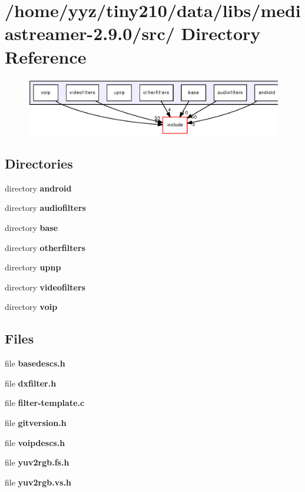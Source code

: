 \section{/home/yyz/tiny210/data/libs/mediastreamer-\/2.9.0/src/ Directory Reference}
\label{dir_d0be9f63c0f346f10187715b2de814fe}


\nopagebreak
\begin{figure}[H]
\begin{center}
\leavevmode
\includegraphics[width=345pt]{dir_d0be9f63c0f346f10187715b2de814fe_dep}
\end{center}
\end{figure}
\subsection*{Directories}
\begin{DoxyCompactItemize}
\item 
directory {\bf android}
\item 
directory {\bf audiofilters}
\item 
directory {\bf base}
\item 
directory {\bf otherfilters}
\item 
directory {\bf upnp}
\item 
directory {\bf videofilters}
\item 
directory {\bf voip}
\end{DoxyCompactItemize}
\subsection*{Files}
\begin{DoxyCompactItemize}
\item 
file {\bfseries basedescs.h}
\item 
file {\bfseries dxfilter.h}
\item 
file {\bfseries filter-\/template.c}
\item 
file {\bfseries gitversion.h}
\item 
file {\bfseries voipdescs.h}
\item 
file {\bfseries yuv2rgb.fs.h}
\item 
file {\bfseries yuv2rgb.vs.h}
\end{DoxyCompactItemize}
